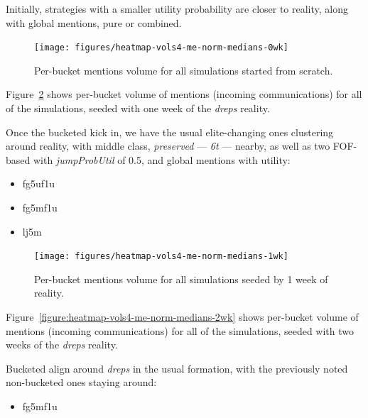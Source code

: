 \documentclass[10pt,oneside]{memoir}
\begin{document}
\begin{Spacing}{2}
Initially, strategies with a smaller utility probability are closer to reality, along with global mentions, pure or combined.



\begin{figure}
\begin{center}
    \texttt{[image: figures/heatmap-vols4-me-norm-medians-0wk]}
    \caption{Per-bucket mentions volume for all simulations started from scratch.}
    \label{figure:heatmap-vols4-me-norm-medians-0wk}
\end{center}
\end{figure}
Figure~\ref{figure:heatmap-vols4-me-norm-medians-1wk} shows per-bucket volume of mentions (incoming communications) for all of the simulations, seeded with one week of the {\itshape dreps} reality.


Once the bucketed kick in, we have the usual elite-changing ones clustering around reality, with middle class, {\itshape preserved} --- {\itshape 6t} --- nearby, as well as two FOF-based with {\itshape jumpProbUtil} of 0.5, and global mentions with utility:


\begin{itemize}


\item fg5uf1u

\item fg5mf1u

\item lj5m
\end{itemize}


\begin{figure}
\begin{center}
    \texttt{[image: figures/heatmap-vols4-me-norm-medians-1wk]}
    \caption{Per-bucket mentions volume for all simulations seeded by 1 week of reality.}
    \label{figure:heatmap-vols4-me-norm-medians-1wk}
\end{center}
\end{figure}
Figure~\ref{figure:heatmap-vols4-me-norm-medians-2wk} shows per-bucket volume of mentions (incoming communications) for all of the simulations, seeded with two weeks of the {\itshape dreps} reality.


Bucketed align around {\itshape dreps} in the usual formation, with the previously noted non-bucketed ones staying around:


\begin{itemize}


\item fg5mf1u


\end{itemize}
\end{Spacing}
\end{document}
